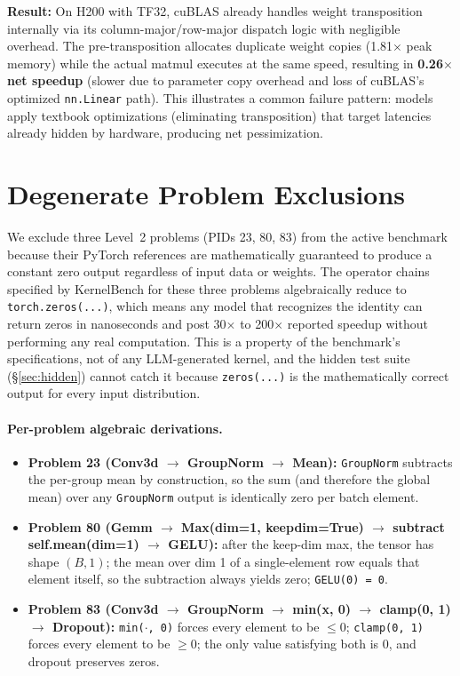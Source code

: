 \documentclass[11pt]{article}
\begin{document}
\textbf{Result:} On H200 with TF32, cuBLAS already handles weight transposition internally via its column-major/row-major dispatch logic with negligible overhead. The pre-transposition allocates duplicate weight copies (1.81$\times$ peak memory) while the actual matmul executes at the same speed, resulting in \textbf{0.26$\times$ net speedup} (slower due to parameter copy overhead and loss of cuBLAS's optimized \texttt{nn.Linear} path). This illustrates a common failure pattern: models apply textbook optimizations (eliminating transposition) that target latencies already hidden by hardware, producing net pessimization.

\section{Degenerate Problem Exclusions}
\label{app:degenerate}

We exclude three Level~2 problems (PIDs 23, 80, 83) from the active benchmark because their PyTorch references are mathematically guaranteed to produce a constant zero output regardless of input data or weights. The operator chains specified by KernelBench for these three problems algebraically reduce to \texttt{torch.zeros(...)}, which means any model that recognizes the identity can return zeros in nanoseconds and post 30$\times$ to 200$\times$ reported speedup without performing any real computation. This is a property of the benchmark's specifications, not of any LLM-generated kernel, and the hidden test suite (\S\ref{sec:hidden}) cannot catch it because \texttt{zeros(...)} is the mathematically correct output for every input distribution.

\paragraph{Per-problem algebraic derivations.}
\begin{itemize}
\item \textbf{Problem 23 (Conv3d $\to$ GroupNorm $\to$ Mean):} \texttt{GroupNorm} subtracts the per-group mean by construction, so the sum (and therefore the global mean) over any \texttt{GroupNorm} output is identically zero per batch element.

\item \textbf{Problem 80 (Gemm $\to$ Max(dim=1, keepdim=True) $\to$ subtract self.mean(dim=1) $\to$ GELU):} after the keep-dim max, the tensor has shape $(B, 1)$; the mean over dim 1 of a single-element row equals that element itself, so the subtraction always yields zero; \texttt{GELU(0) = 0}.

\item \textbf{Problem 83 (Conv3d $\to$ GroupNorm $\to$ min(x, 0) $\to$ clamp(0, 1) $\to$ Dropout):} \texttt{min($\cdot$, 0)} forces every element to be $\le 0$; \texttt{clamp(0, 1)} forces every element to be $\ge 0$; the only value satisfying both is 0, and dropout preserves zeros.
\end{itemize}
\end{document}
